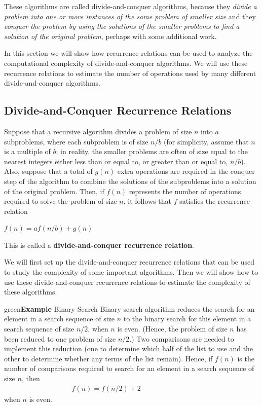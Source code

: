\documentclass[11pt]{article}
\newenvironment{example}[1][\unskip]{\begin{mybox}{green}{\textbf{Example} {#1}}}{\end{mybox}}
\begin{document}
These algorithms are called divide-and-conquer algorithms, because they \textit{divide a problem into one or more instances of the same problem of smaller size} and they \textit{conquer the problem by using the solutions of the smaller problems to find a solution of the original problem}, perhaps with some additional work.

In this section we will show how recurrence relations can be used to analyze the computational complexity of divide-and-conquer algorithms. We will use these recurrence relations to estimate the number of operations used by many different divide-and-conquer algorithms.

\subsection{Divide-and-Conquer Recurrence Relations}

Suppose that a recursive algorithm divides a problem of size $n$ into $a$ subproblems, where each subproblem is of size $n/b$ (for simplicity, assume that $n$ is a multiple of $b$; in reality, the smaller problems are often of size equal to the nearest integers either less than or equal to, or greater than or equal to, $n/b$). Also, suppose that a total of $g(n)$ extra operations are required in the conquer step of the algorithm to combine the solutions of the subproblems into a solution of the original problem. Then, if $f(n)$ represents the number of operations required to solve the problem of size $n$, it follows that $f$ satisfies the recurrence relation

$f(n) = a f(n/b) + g(n)$

\noindent This is called a \textbf{divide-and-conquer recurrence relation}.

We will first set up the divide-and-conquer recurrence relations that can be used to study the complexity of some important algorithms. Then we will show how to use these divide-and-conquer recurrence relations to estimate the complexity of these algorithms.

\begin{example}[Binary Search]
Binary search algorithm reduces the search for an element in a search sequence of size $n$ to the binary search for this element in a search sequence of size $n/2$, when $n$ is even. (Hence, the problem of size $n$ has been reduced to one problem of size $n/2$.) Two comparisons are needed to implement this reduction (one to determine which half of the list to use and the other to determine whether any terms of the list remain). Hence, if $f(n)$ is the number of comparisons required to search for an element in a search sequence of size $n$, then
\begin{align*}
    f(n) = f(n/2) + 2 & & & & & & & & &
\end{align*}
when $n$ is even.
\end{example}
\end{document}
